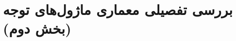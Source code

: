 \documentclass[12pt,a4paper]{report}
\begin{document}
\chapter*{بررسی تفصیلی معماری ماژول‌های توجه (بخش دوم)}

\end{document}
